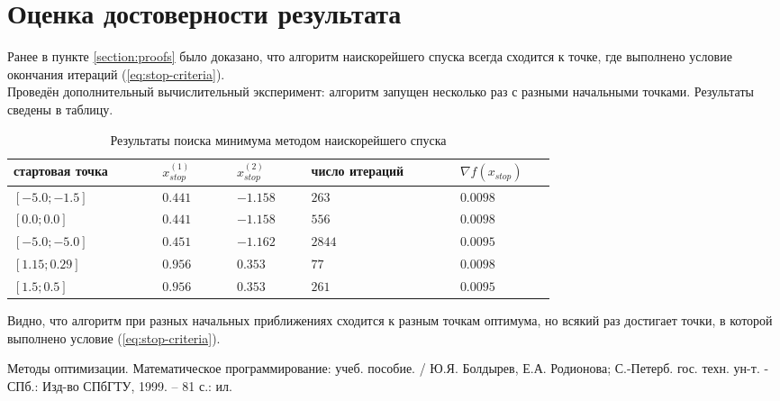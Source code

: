\documentclass[main.tex]{subfiles}
\begin{document}
\section{Оценка достоверности результата}
Ранее в пункте \ref{section:proofs} было доказано, что алгоритм наискорейшего спуска всегда сходится к точке, где выполнено условие окончания итераций (\ref{eq:stop-criteria}). \\
Проведён дополнительный вычислительный эксперимент: алгоритм запущен несколько раз с разными начальными точками. Результаты сведены в таблицу.

\begin{table}[h]
	\label{table:results}
	\caption{Результаты поиска минимума методом наискорейшего спуска}
\begin{center}
	\begin{tabular} { | p{0.2\linewidth} | p{0.1\linewidth} | p{0.1\linewidth} | p{0.2\linewidth} | p{0.1\linewidth} |}
		\hline
стартовая точка& $x_{stop}^{(1)}$ & $x_{stop}^{(2)}$ & число итераций  &  $\nabla f(x_{stop})$   \\ \hline
		$[-5.0; -1.5]$ & $0.441$ & $-1.158$ & $263$  & $0.0098$  \\ \hline
		$[0.0; 0.0]$ & $0.441$ & $-1.158$ & $556$  & $0.0098$  \\ \hline
		$[-5.0; -5.0]$ & $0.451$ & $-1.162$ & $2844$  & $0.0095$  \\ \hline
		$[1.15; 0.29]$ & $0.956$ & $0.353$ & $77$  & $0.0098$  \\ \hline
		$[1.5; 0.5]$ & $0.956$ & $0.353$ & $261$  & $0.0095$  \\ \hline
	\end{tabular}
\end{center}
Видно, что алгоритм при разных начальных приближениях сходится к разным точкам оптимума, но всякий раз достигает точки, в которой выполнено условие (\ref{eq:stop-criteria}).
\end{table}


\begin{thebibliography}{99}
	 Методы оптимизации. Математическое программирование: учеб. пособие. / Ю.Я. Болдырев, Е.А. Родионова; С.-Петерб. гос. техн. ун-т. - СПб.: Изд-во СПбГТУ, 1999. -- 81 с.: ил.
\end{thebibliography}
\end{document}
